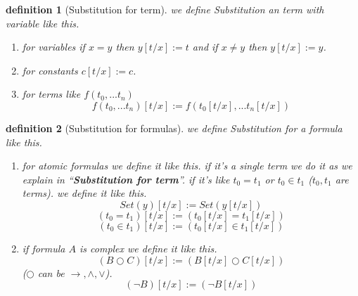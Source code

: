 \documentclass[10pt,a4paper]{book}
\newtheorem{definition}{definition}[section]
\begin{document}
%
\begin{definition}
    [Substitution for term] we define Substitution an term with variable  like this.
    \begin{enumerate}
        \setlength{\itemsep}{0pt} %
        \item for variables if $x=y$ then $y[t/x]:=t$ and if $x \not= y$ then $y[t/x]:=y$.
        \item for constants $c[t/x]:=c$.
        \item for terms like $f(t_{0},...t_{n})$
              \[ f(t_{0},...t_{n})[t/x] := f(t_{0}[t/x],...t_{n}[t/x])\]
    \end{enumerate}
\end{definition}

\begin{definition}
    [Substitution for formulas] we define Substitution for a formula like this.
    \begin{enumerate}
        \setlength{\itemsep}{0pt} %
        \item for atomic formulas we define it like this. if it's a single term we do it as
              we explain in ``\textbf{Substitution for term}''. if it's like $t_0=t_1$ or
              $t_0 \in t_1$ ($t_0 , t_1$ are terms). we define it like this.
              \[ Set(y)[t/x] := Set(y[t/x]) \]
              \[ (t_0=t_1)[t/x] := (t_0[t/x] = t_1[t/x]) \]
              \[ (t_0 \in t_1)[t/x] := (t_0[t/x] \in t_1[t/x]) \]
        \item if formula $A$ is complex we define it like this.
              \[ (B \bigcirc C)[t/x] := (B[t/x] \bigcirc C[t/x]) \]
              ($\bigcirc $ can be $\to,\land ,\lor$).
              \[ (\neg B)[t/x] := (\neg B[t/x]) \]
    \end{enumerate}
\end{definition}
\end{document}

